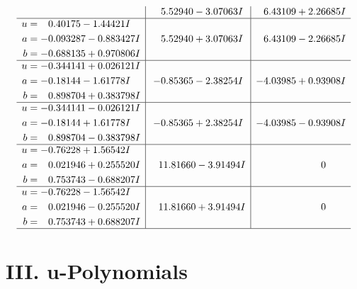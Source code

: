 \documentclass[1p]{elsarticle_modified}
\theoremstyle{definition}
\begin{document}
$$\begin{array}{c|c|c}
 & \phantom{-}5.52940 - 3.07063 I & \phantom{-}6.43109 + 2.26685 I \\ \hline\begin{aligned}
u &= \phantom{-}0.40175 - 1.44421 I \\
a &= -0.093287 - 0.883427 I \\
b &= -0.688135 + 0.970806 I\end{aligned}
 & \phantom{-}5.52940 + 3.07063 I & \phantom{-}6.43109 - 2.26685 I \\ \hline\begin{aligned}
u &= -0.344141 + 0.026121 I \\
a &= -0.18144 - 1.61778 I \\
b &= \phantom{-}0.898704 + 0.383798 I\end{aligned}
 & -0.85365 - 2.38254 I & -4.03985 + 0.93908 I \\ \hline\begin{aligned}
u &= -0.344141 - 0.026121 I \\
a &= -0.18144 + 1.61778 I \\
b &= \phantom{-}0.898704 - 0.383798 I\end{aligned}
 & -0.85365 + 2.38254 I & -4.03985 - 0.93908 I \\ \hline\begin{aligned}
u &= -0.76228 + 1.56542 I \\
a &= \phantom{-}0.021946 + 0.255520 I \\
b &= \phantom{-}0.753743 - 0.688207 I\end{aligned}
 & \phantom{-}11.81660 - 3.91494 I & \phantom{-0.000000 } 0 \\ \hline\begin{aligned}
u &= -0.76228 - 1.56542 I \\
a &= \phantom{-}0.021946 - 0.255520 I \\
b &= \phantom{-}0.753743 + 0.688207 I\end{aligned}
 & \phantom{-}11.81660 + 3.91494 I & \phantom{-0.000000 } 0\\
 \hline 
 \end{array}$$\newpage
\newpage\renewcommand{\arraystretch}{1}
\centering \section*{ III. u-Polynomials}
\end{document}
